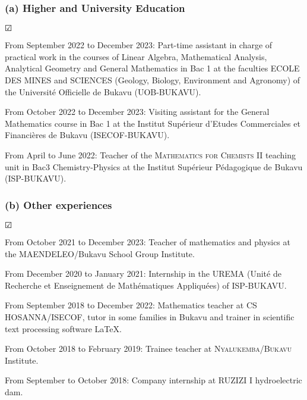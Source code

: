 \documentclass[10pt,a4paper,oneside]{article}
\begin{document}
\subsubsection*{(a) Higher and University Education}
\begin{list}{$ \CheckedBox $}{}
	\item
From September 2022 to December 2023: Part-time assistant in charge of practical work in the courses of Linear Algebra, Mathematical Analysis, Analytical Geometry and General Mathematics in Bac 1 at the faculties ECOLE DES MINES and SCIENCES (Geology, Biology, Environment and Agronomy) of the Université Officielle de Bukavu (UOB-BUKAVU).
\item
From October 2022 to December 2023: Visiting assistant for the General Mathematics course in Bac 1 at the Institut Supérieur d'Etudes Commerciales et Financières de Bukavu (ISECOF-BUKAVU).
	
\item
From April to June 2022: Teacher of the \textsc{Mathematics for Chemists II} teaching unit in Bac3 Chemistry-Physics at the Institut Supérieur Pédagogique de Bukavu (ISP-BUKAVU).
	
\end{list}
\subsubsection*{(b) Other experiences}
\begin{list}{$ \CheckedBox $}{}
	\item
	From October 2021 to December 2023: Teacher of mathematics and physics at the MAENDELEO/Bukavu School Group Institute.
\item
From December 2020 to January 2021: Internship in the UREMA (Unité de Recherche et Enseignement de Mathématiques Appliquées) of ISP-BUKAVU.
\item
From September 2018 to December 2022: Mathematics teacher at CS HOSANNA/ISECOF, tutor in some families in Bukavu and trainer in scientific text processing software \LaTeX.
\item
From October 2018 to February 2019: Trainee teacher at \textsc{Nyalukemba/Bukavu} Institute.
\item
From September to October 2018: Company internship at RUZIZI I hydroelectric dam.
\end{list}
\end{document}
